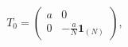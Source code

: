 \begin{equation}
T_{0}=\left(
\begin{array}{cc}
a & 0 \\
0 & -\frac{a}{N}\mathbf{1}_{(N)}%
\end{array}
\right) ,
\end{equation}

